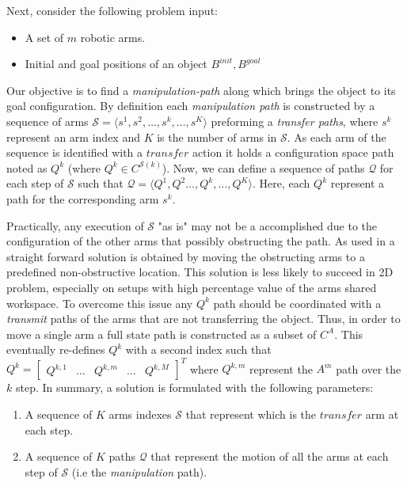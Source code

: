 \documentclass[english]{article}
\theoremstyle{definition}
\begin{document}
Next, consider the following problem input:
\begin{itemize}
\item A set of $m$ robotic arms. 
\item Initial and goal positions of an object $B^{init},B^{goal}$
\end{itemize}
Our objective is to find a \textit{manipulation-path} along which brings the object to its goal configuration. By definition each \textit{manipulation path} is constructed by a sequence of arms $\mathcal{S} = \langle s^1,s^2,\dots,s^k,\dots,s^K \rangle$ preforming a \textit{transfer paths}, where $s^k$ represent an arm index and $K$ is the number of arms in $\mathcal{S}$. As each arm of the sequence is identified with a $transfer$ action it holds a configuration space path noted as $Q^k$ (where $Q^k \in C^{\mathcal{S}(k)}$). Now, we can define a sequence of paths $\mathcal{Q}$ for each step of $\mathcal{S}$ such that $\mathcal{Q} = \langle Q^1,Q^2\dots,Q^k,\dots,Q^K \rangle$. Here, each $Q^k$ represent a path for the corresponding arm $s^k$.  

Practically, any execution of $\mathcal{S}$ "as is" may not be a accomplished due to the configuration of the other arms that possibly obstructing the path. As used in \cite{koga1994multi} a straight forward solution is obtained by moving the obstructing arms to a predefined non-obstructive location. This solution is less likely to succeed in 2D problem, especially on setups with high percentage value of the arms shared workspace. To overcome this issue any $Q^k$ path should be coordinated with a \textit{transmit} paths of the arms that are not transferring the object. Thus, in order to move a single arm a full state path is constructed as a subset of $C^A$. This eventually re-defines $Q^k$ with a second index such that $Q^k = \begin{bmatrix} Q^{k,1} & \dots & Q^{k,m} & \dots & Q^{k,M} \end{bmatrix}^T$ where $Q^{k,m}$ represent the $A^m$ path over the $k$ step. In summary, a solution is formulated with the following parameters:
\begin{enumerate}
\item A sequence of $K$ arms indexes $\mathcal{S}$ that represent which is the $transfer$ arm at each step.
\item A sequence of $K$ paths $\mathcal{Q}$ that represent the motion of all the arms at each step of $\mathcal{S}$ (i.e the \textit{manipulation} path).  
\end{enumerate}
\end{document}
